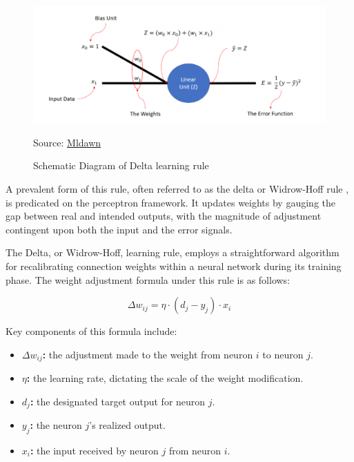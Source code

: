 \documentclass[12pt,a4paper]{report}
\begin{document}
\begin{figure}[H]
    \centering
    \includegraphics[width=1.0\textwidth]{./data/Diagram of Delta learning rule.jpg}
    \caption{Schematic Diagram of Delta learning rule}
    \label{fig:my_picture}
    \vspace{1pt} %
    \small{Source: \href{https://www.mldawn.com/what-is-the-delta-rule-part-1/}{Mldawn}}
\end{figure}

A prevalent form of this rule, often referred to as the delta or Widrow-Hoff rule \cite{BernardWidrow1960AdaptiveSwitchingCircuits}, is predicated on the perceptron framework. It updates weights by gauging the gap between real and intended outputs, with the magnitude of adjustment contingent upon both the input and the error signals.

The Delta, or Widrow-Hoff, learning rule, employs a straightforward algorithm for recalibrating connection weights within a neural network during its training phase. The weight adjustment formula under this rule is as follows:

\[ \Delta w_{ij} = \eta \cdot (d_j - y_j) \cdot x_i \]

Key components of this formula include:

\begin{itemize}
    \item \textbf{ $\Delta w_{ij}$:} the adjustment made to the weight from neuron \( i \) to neuron \( j \).
    \item \textbf{$\eta $:} the learning rate, dictating the scale of the weight modification.
    \item \textbf{ $d_{j}$:} the designated target output for neuron \( j \).
    \item \textbf{$y_j$:} the neuron \( j \)'s realized output.
    \item \textbf{$x_i$:} the input received by neuron \( j \) from neuron \( i \).
\end{itemize}
\end{document}
